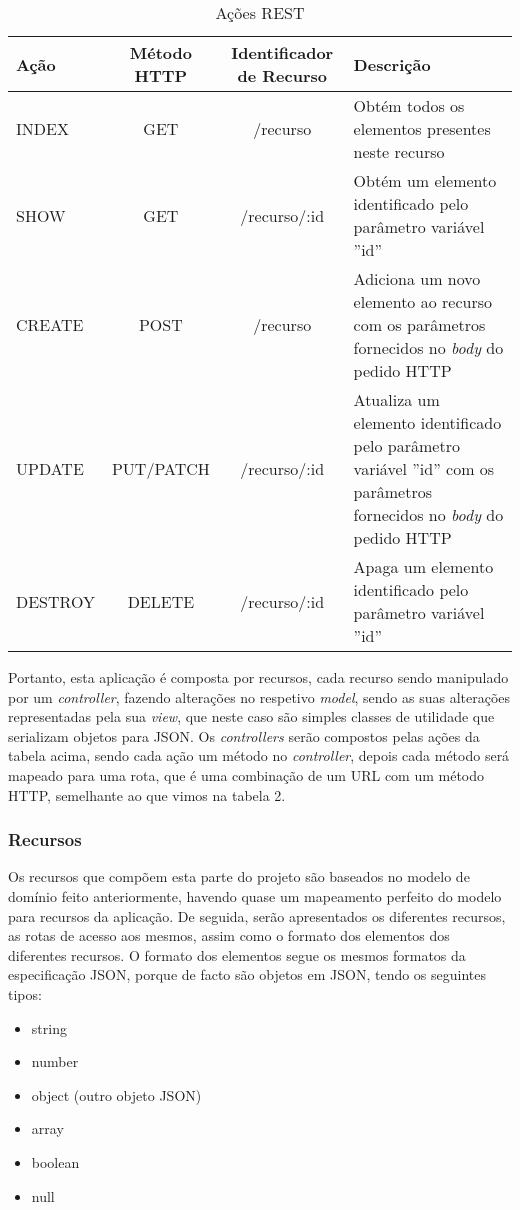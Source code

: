 \begin{table}[H]
\centering
  \begin{tabularx}{\textwidth}{ | l | c | c | X | }
    \hline
    Ação & Método HTTP & Identificador de Recurso & Descrição\\  \hline
    INDEX & GET & /recurso & Obtém todos os elementos presentes neste recurso\\ \hline
    SHOW & GET & /recurso/:id & Obtém um elemento identificado pelo parâmetro variável ''id'' \\ \hline
    CREATE & POST & /recurso & Adiciona um novo elemento ao recurso com os parâmetros fornecidos no \textit{body} do pedido HTTP\\ \hline
    UPDATE & PUT/PATCH & /recurso/:id & Atualiza um elemento identificado pelo parâmetro variável ''id'' com os parâmetros fornecidos no \textit{body} do pedido HTTP \\ \hline
    DESTROY & DELETE & /recurso/:id & Apaga um elemento identificado pelo parâmetro variável ''id'' \\ \hline
  \end{tabularx}
  \caption{Ações REST}
\end{table}

Portanto, esta aplicação é composta por recursos, cada recurso sendo manipulado por um \textit{controller}, fazendo alterações no respetivo \textit{model}, sendo as suas alterações representadas pela sua \textit{view}, que neste caso são simples classes de utilidade que serializam objetos para JSON. Os \textit{controllers} serão compostos pelas ações da tabela acima, sendo cada ação um método no \textit{controller}, depois cada método será mapeado para uma rota, que é uma combinação de um URL com um método HTTP, semelhante ao que vimos na tabela 2.





\subsubsection{Recursos}

Os recursos que compõem esta parte do projeto são baseados no modelo de domínio feito anteriormente, havendo quase um mapeamento perfeito do modelo para recursos da aplicação. De seguida, serão apresentados os diferentes recursos, as rotas de acesso aos mesmos, assim como o formato dos elementos dos diferentes recursos. O formato dos elementos segue os mesmos formatos da especificação JSON, porque de facto são objetos em JSON, tendo os seguintes tipos:
\begin{itemize}
    \item string
    \item number
    \item object (outro objeto JSON)
    \item array
    \item boolean
    \item null
\end{itemize}

